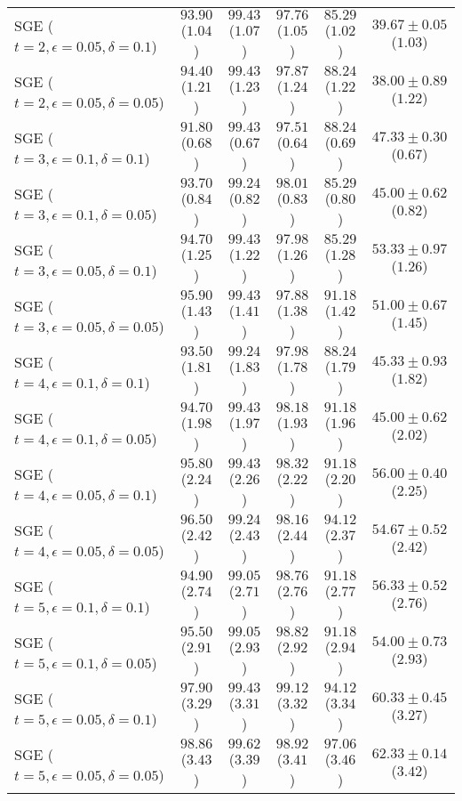 \documentclass[journal]{IEEEtran}
\theoremstyle{definition}
\begin{document}
\begin{table}[!htbp]
\begin{center}
{\begin{tabular}{|l|c|c|c|c|c|}
SGE ($t=2, \epsilon = 0.05, \delta = 0.1$) & $93.90$ ($1.04$) & $99.43$ ($1.07$) & $97.76$ ($1.05$) & $85.29$ ($1.02$) & $39.67\pm 0.05$ ($1.03$) \\
SGE ($t=2, \epsilon = 0.05, \delta = 0.05$) & $94.40$ ($1.21$) & $99.43$ ($1.23$) & $97.87$ ($1.24$) & $88.24$ ($1.22$) & $38.00\pm 0.89$ ($1.22$) \\
\hline
SGE ($t=3, \epsilon = 0.1, \delta = 0.1$) & $91.80$ ($0.68$) & $99.43$ ($0.67$) & $97.51$ ($0.64$) & $88.24$ ($0.69$) & $47.33\pm 0.30$ ($0.67$) \\
SGE ($t=3, \epsilon = 0.1, \delta = 0.05$) & $93.70$ ($0.84$) & $99.24$ ($0.82$) & $98.01$ ($0.83$) & $85.29$ ($0.80$) & $45.00\pm 0.62$ ($0.82$) \\
SGE ($t=3, \epsilon = 0.05, \delta = 0.1$) & $94.70$ ($1.25$) & $99.43$ ($1.22$) & $97.98$ ($1.26$) & $85.29$ ($1.28$) & $53.33\pm 0.97$ ($1.26$) \\
SGE ($t=3, \epsilon = 0.05, \delta = 0.05$) & $95.90$ ($1.43$) & $99.43$ ($1.41$) & $97.88$ ($1.38$) & $91.18$ ($1.42$) & $51.00\pm 0.67$ ($1.45$) \\
\hline
SGE ($t=4, \epsilon = 0.1, \delta = 0.1$) & $93.50$ ($1.81$) & $99.24$ ($1.83$) & $97.98$ ($1.78$) & $88.24$ ($1.79$) & $45.33\pm 0.93$ ($1.82$) \\
SGE ($t=4, \epsilon = 0.1, \delta = 0.05$) & $94.70$ ($1.98$) & $99.43$ ($1.97$) & $98.18$ ($1.93$) & $91.18$ ($1.96$) & $45.00\pm 0.62$ ($2.02$) \\
SGE ($t=4, \epsilon = 0.05, \delta = 0.1$) & $95.80$ ($2.24$) & $99.43$ ($2.26$) & $98.32$ ($2.22$) & $91.18$ ($2.20$) & $56.00\pm 0.40$ ($2.25$) \\
SGE ($t=4, \epsilon = 0.05, \delta = 0.05$) & $96.50$ ($2.42$) & $99.24$ ($2.43$) & $98.16$ ($2.44$) & $94.12$ ($2.37$) & $54.67\pm 0.52$ ($2.42$) \\
\hline
SGE ($t=5, \epsilon = 0.1, \delta = 0.1$) & $94.90$ ($2.74$) & $99.05$ ($2.71$) & $98.76$ ($2.76$) & $91.18$ ($2.77$) & $56.33\pm 0.52$ ($2.76$) \\
SGE ($t=5, \epsilon = 0.1, \delta = 0.05$) & $95.50$ ($2.91$) & $99.05$ ($2.93$) & $98.82$ ($2.92$) & $91.18$ ($2.94$) & $54.00\pm 0.73$ ($2.93$) \\
SGE ($t=5, \epsilon = 0.05, \delta = 0.1$) & $97.90$ ($3.29$) & $99.43$ ($3.31$) & $\mathbf{99.12}$ ($3.32$) & $94.12$ ($3.34$) & $60.33\pm 0.45$ ($3.27$) \\
SGE ($t=5, \epsilon = 0.05, \delta = 0.05$) & $\mathbf{98.86}$ ($3.43$) & $\mathbf{99.62}$ ($3.39$) & $98.92$ ($3.41$) & $\mathbf{97.06}$ ($3.46$) & $\mathbf{62.33\pm 0.14}$ ($3.42$) \\
\hline
\end{tabular}}
\end{center}
\end{table}
\end{document}
